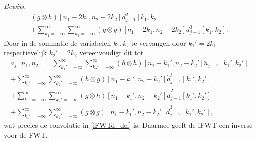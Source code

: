 \begin{proof}[Bewijs]
\begin{equation*}
\begin{split}
      (g\otimes h)[n_1-2k_1,n_2-2k_2] d^2_{j-1}[k_1,k_2] \\
      + \sum_{k_1=-\infty}^\infty\sum_{k_2=-\infty}^\infty 
      (g\otimes g)[n_1-2k_1,n_2-2k_2] d^3_{j-1}[k_1,k_2].
      \end{split}
  \end{equation*}
  Door in de sommatie de variabelen $k_1,k_2$ te vervangen door $k_1'=2k_1$ respectievelijk $k_2'=2k_2$ 
  vereenvoudigt dit tot
  \begin{equation*}
    \begin{split}
      a_{j}[n_1,n_2] = 
      \sum_{k_1'=-\infty}^\infty\sum_{k_2'=-\infty}^\infty 
      (h\otimes h)[n_1-k_1',n_2-k_2'] \breve a_{j-1}[k_1',k_2'] \\
      + \sum_{k_1'=-\infty}^\infty\sum_{k_2'=-\infty}^\infty 
      (h\otimes g)[n_1-k_1',n_2-k_2'] \breve d^1_{j-1}[k_1',k_2'] \\
      + \sum_{k_1'=-\infty}^\infty\sum_{k_2'=-\infty}^\infty 
      (g\otimes h)[n_1-k_1',n_2-k_2'] \breve d^2_{j-1}[k_1',k_2'] \\
      + \sum_{k_1'=-\infty}^\infty\sum_{k_2'=-\infty}^\infty 
      (g\otimes g)[n_1-k_1',n_2-k_2'] \breve d^3_{j-1}[k_1',k_2'],
      \end{split}
  \end{equation*}
  wat precies de convolutie in \eqref{iFWTd_def} is. Daarmee geeft de iFWT een inverse voor de FWT.
\end{proof}


